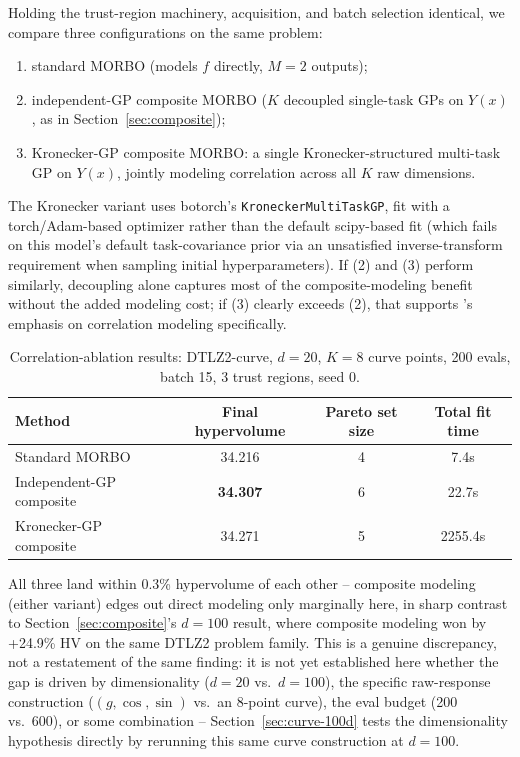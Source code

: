 \documentclass[11pt]{article}
\begin{document}
Holding the trust-region machinery, acquisition, and batch selection
identical, we compare three configurations on the same problem:
\begin{enumerate}[nosep]
  \item standard MORBO (models $f$ directly, $M=2$ outputs);
  \item independent-GP composite MORBO ($K$ decoupled single-task GPs on
    $Y(x)$, as in Section~\ref{sec:composite});
  \item Kronecker-GP composite MORBO: a single Kronecker-structured
    multi-task GP \citep{bonilla2007mtgp} on $Y(x)$, jointly modeling
    correlation across all $K$ raw dimensions.
\end{enumerate}
The Kronecker variant uses botorch's \texttt{KroneckerMultiTaskGP}, fit with
a torch/Adam-based optimizer rather than the default scipy-based fit (which
fails on this model's default task-covariance prior via an unsatisfied
inverse-transform requirement when sampling initial hyperparameters). If
(2) and (3) perform similarly, decoupling alone captures most of the
composite-modeling benefit without the added modeling cost; if (3) clearly
exceeds (2), that supports \citeauthor{maddox2021hogp}'s emphasis on
correlation modeling specifically.

\begin{table}[h]
\centering
\caption{Correlation-ablation results: DTLZ2-curve, $d=20$, $K=8$ curve points, 200 evals, batch 15, 3 trust regions, seed 0.}
\label{tab:kronecker-results}
\begin{tabular}{lccc}
\toprule
Method & Final hypervolume & Pareto set size & Total fit time \\
\midrule
Standard MORBO & 34.216 & 4 & 7.4s \\
Independent-GP composite & \textbf{34.307} & 6 & 22.7s \\
Kronecker-GP composite & 34.271 & 5 & 2255.4s \\
\bottomrule
\end{tabular}
\end{table}

All three land within 0.3\% hypervolume of each other -- composite modeling
(either variant) edges out direct modeling only marginally here, in sharp
contrast to Section~\ref{sec:composite}'s $d=100$ result, where composite
modeling won by +24.9\% HV on the same DTLZ2 problem family. This is a
genuine discrepancy, not a restatement of the same finding: it is not yet
established here whether the gap is driven by dimensionality ($d=20$ vs.\
$d=100$), the specific raw-response construction ($(g,\cos,\sin)$ vs.\ an
8-point curve), the eval budget (200 vs.\ 600), or some combination --
Section~\ref{sec:curve-100d} tests the dimensionality hypothesis directly by
rerunning this same curve construction at $d=100$.
\end{document}
